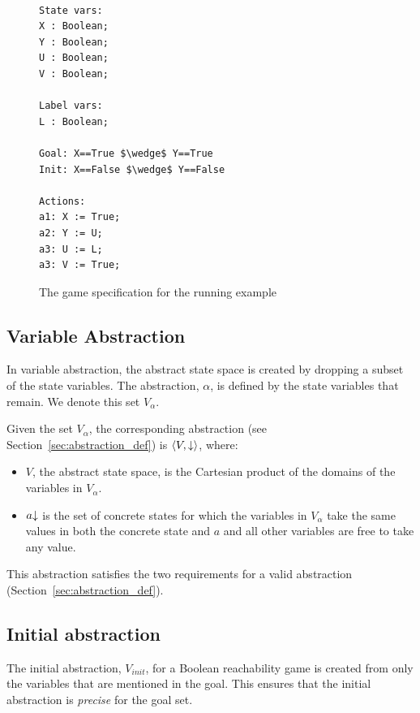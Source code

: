 \begin{figure}
\begin{lstlisting}[mathescape]

State vars:
X : Boolean;
Y : Boolean;
U : Boolean;
V : Boolean;

Label vars:
L : Boolean;

Goal: X==True $\wedge$ Y==True
Init: X==False $\wedge$ Y==False

Actions:
a1: X := True;
a2: Y := U;
a3: U := L;
a3: V := True;

\end{lstlisting}
\caption{The game specification for the running example}
\label{fig:running_example}
\end{figure}

\subsection{Variable Abstraction}

In variable abstraction, the abstract state space is created by dropping a subset of the state variables. The abstraction, $\alpha$, is defined by the state variables that remain. We denote this set $V_{\alpha}$.

Given the set $V_{\alpha}$, the corresponding abstraction (see Section~\ref{sec:abstraction_def}) is $\langle V, \mathord{\downarrow} \rangle$, where:
\begin{itemize}
    \item $V$, the abstract state space, is the Cartesian product of the domains of the variables in $V_{\alpha}$.
    \item $a\mathord{\downarrow}$ is the set of concrete states for which the variables in $V_{\alpha}$ take the same values in both the concrete state and $a$ and all other variables are free to take any value.
\end{itemize}

This abstraction satisfies the two requirements for a valid abstraction (Section~\ref{sec:abstraction_def}). 

\subsection{Initial abstraction}

The initial abstraction, $V_{init}$, for a Boolean reachability game is created from only the variables that are mentioned in the goal. This ensures that the initial abstraction is \emph{precise} for the goal set.


